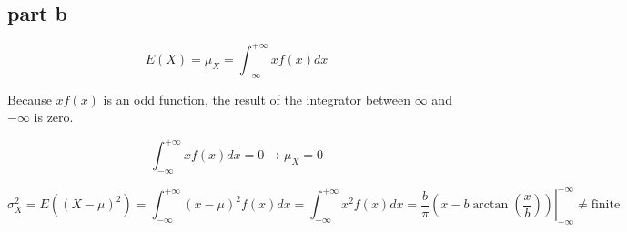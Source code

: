 \subsection{part b}
$$
E(X) = \mu_X = \int_{-\infty}^{+\infty} xf(x) dx
$$

Because $xf(x)$ is an odd function, the result of the integrator between $\infty$ and $-\infty$ is zero.

$$
\int_{-\infty}^{+\infty} xf(x) dx = 0 \to \mu_X = 0
$$

$$
\sigma^2_X = E((X-\mu)^2) = \int_{-\infty}^{+\infty} (x-\mu)^2 f(x) dx = \int_{-\infty}^{+\infty} x^2 f(x) dx = \left. \dfrac{b}{\pi}(x - b\arctan(\dfrac{x}{b})) \right|_{-\infty}^{+\infty} \neq \text{finite}
$$
